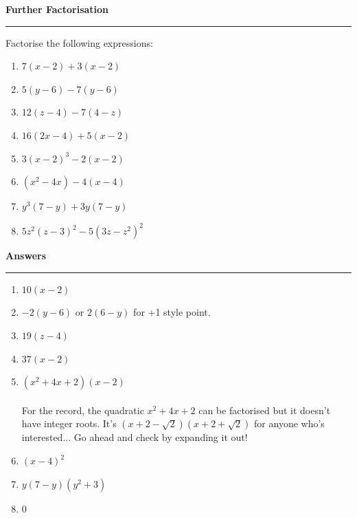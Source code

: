 \documentclass[]{article}
\begin{document}
\newpage

\noindent \textbf{Further Factorisation}

\medskip

\hrule

\medskip

\noindent Factorise the following expressions:

\begin{enumerate}

    \item $7(x-2) + 3(x-2)$
    \item $5(y-6) - 7(y-6)$
    \item $12(z-4) - 7(4-z)$
    \item $16(2x-4) + 5(x-2)$
    \item $3(x-2)^3 - 2(x-2)$
    \item $(x^2-4x) - 4(x-4)$
    \item $y^3(7-y) + 3y(7-y)$
    \item $5z^2(z-3)^2 - 5(3z-z^2)^2 $

\end{enumerate}

\newpage

\noindent \textbf{Answers}

\medskip

\hrule

\medskip

\begin{enumerate}
    \item $10(x-2)$
    \item $-2(y-6)$ or $2(6-y)$ for +1 style point.
    \item $19(z-4)$
    \item $37(x-2)$
    \item $(x^2+4x+2)(x-2)$ \\
    \\
    For the record, the quadratic $x^2+4x+2$ can be factorised but it doesn't have integer roots. It's $(x+2-\sqrt{2})(x+2+\sqrt{2})$ for anyone who's interested... Go ahead and check by expanding it out!
    \item $(x-4)^2$
    \item $y(7-y)(y^2+3)$
    \item 0
\end{enumerate}

\newpage
\end{document}
